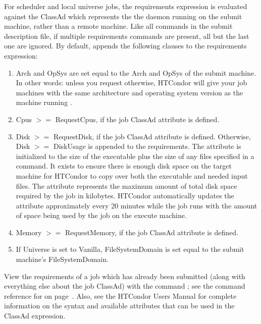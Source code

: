 \begin{description}
For scheduler and local universe jobs, the requirements expression is
evaluated against
the  ClassAd which represents the 
the  daemon running on the submit machine,
rather than a remote machine.
Like all commands in the submit description file, if multiple requirements
commands are present, all but the last one are ignored.
By default,  appends the following clauses to
the requirements expression:
\begin{enumerate}
        \item Arch and OpSys are set equal to the Arch and OpSys of the
submit machine.  In other words: unless you request otherwise, 
HTCondor will give your
job machines with the same architecture and operating system version as
the machine running .
        \item Cpus $>=$ RequestCpus, if the job ClassAd attribute
 is defined.
        \item Disk $>=$ RequestDisk, if the job ClassAd attribute
 is defined.
Otherwise, Disk $>=$ DiskUsage is appended to the requirements.
The  attribute is initialized to the size of the
executable plus the size of any files specified in a
 command.
It exists to ensure there is enough disk space on the
target machine for HTCondor to copy over both the executable
and needed input files.
The  attribute represents the maximum amount of
total disk space required by the job in kilobytes.
HTCondor automatically updates the  attribute
approximately every 20 minutes while the job runs with the
amount of space being used by the job on the execute machine.
        \item Memory $>=$ RequestMemory, if the job ClassAd attribute
 is defined.
        \item If Universe is set to Vanilla, FileSystemDomain is set equal to
the submit machine's FileSystemDomain.
\end{enumerate}
View the requirements of a job
which has already been submitted (along with everything else about the
job ClassAd) with the command ; see the command reference for
 on page~\pageref{man-condor-q}.  Also, see the HTCondor Users
Manual for complete information on the syntax and available attributes
that can be used in the ClassAd expression.


\end{description} 

